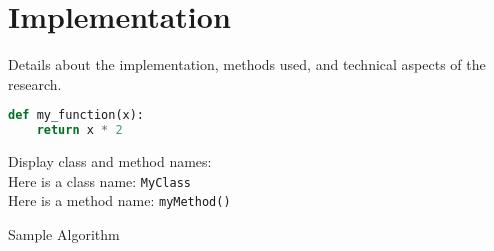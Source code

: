 \chapter{Implementation}
Details about the implementation, methods used, and technical aspects of the research.




\begin{lstlisting}[caption={Sample Inline Python Code}, label={code:sample_python_inline}, language=Python]
def my_function(x):
    return x * 2
\end{lstlisting}

Display class and method names:\\
Here is a class name: \texttt{MyClass}\\
Here is a method name: \texttt{myMethod()}


\begin{algorithm}[H]
    \caption{Sample Algorithm}
    \label{alg:sample_algorithm}
\end{algorithm}

